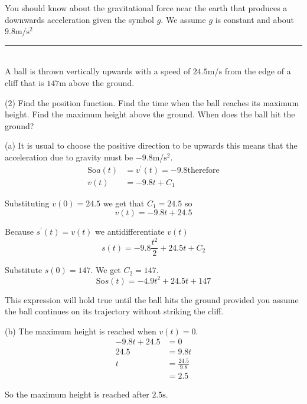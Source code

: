 You should know about the gravitational force near the earth that produces a downwards acceleration
given the symbol $g$. We assume $g$ is constant and about $9.8 \mbox{m}$/$\mathrm{s}^{2}$ 
\rule{6.8cm}{0.5pt}\\
\example A ball is thrown vertically upwards with a speed of $24.5 \mbox{m}$/$\mbox{s}$ from the edge of a cliff that is $147 \mbox{m}$ above the ground. 
\begin{tasks}(2)
\task Find the position function. 
\task Find the time when the ball reaches its maximum height. 
\task Find the maximum height above the ground. 
\task When does the ball hit the ground? \end{tasks}

\solution
(a) It is usual to choose the positive direction
to be upwards this means that the acceleration due to gravity must be $ -9.8 \mbox{m}$/$\mathrm{s}^{2}$.
\begin{align*}\text{So}a (t) &  = v^{ \prime } (t) = -9.8\text{therefore} \\
v (t) &  =  -9.8 t +C_{1}\end{align*}

Substituting $v (0) =24.5$ we get that $C_{1} =24.5$ so
\begin{equation*}v (t) = -9.8 t +24.5
\end{equation*}

Because $s^{ \prime } (t) =v (t)$ we antidifferentiate $v (t)$
\begin{equation*}s (t) = -9.8 \frac{t^{2}}{2} +24.5 t +C_{2}
\end{equation*}

Substitute $s (0) =147$. We get $C_{2} =147$.
\begin{equation*}\text{So}s (t) = -4.9 t^{2} +24.5 t +147
\end{equation*}

This expression will hold true until the ball hits the ground provided you assume the ball continues
on its trajectory without striking the cliff. 

(b) The maximum height is reached when $v (t) =0$.
\begin{align*} -9.8 t +24.5 &  = 0 \\
24.5 &  = 9.8 t \\
t &  = \frac{24.5}{9.8} \\
 &  = 2.5\end{align*}

So the maximum height is reached after $2.5 \mbox{s}$. 

